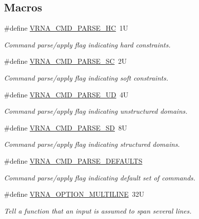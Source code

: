 \subsection*{Macros}
\begin{DoxyCompactItemize}
\item 
\#define \hyperlink{group__file__utils_gac54dec838d7b6bebd5df85f71702d324}{V\+R\+N\+A\+\_\+\+C\+M\+D\+\_\+\+P\+A\+R\+S\+E\+\_\+\+HC}~1U
\begin{DoxyCompactList}\small\item\em Command parse/apply flag indicating hard constraints. \end{DoxyCompactList}\item 
\#define \hyperlink{group__file__utils_ga8cad3c1f83e6f149829c49a186a83e21}{V\+R\+N\+A\+\_\+\+C\+M\+D\+\_\+\+P\+A\+R\+S\+E\+\_\+\+SC}~2U
\begin{DoxyCompactList}\small\item\em Command parse/apply flag indicating soft constraints. \end{DoxyCompactList}\item 
\#define \hyperlink{group__file__utils_ga6c6409780698826b04ebfed9151d7649}{V\+R\+N\+A\+\_\+\+C\+M\+D\+\_\+\+P\+A\+R\+S\+E\+\_\+\+UD}~4U
\begin{DoxyCompactList}\small\item\em Command parse/apply flag indicating unstructured domains. \end{DoxyCompactList}\item 
\#define \hyperlink{group__file__utils_gaf5e20210173cdb83bf70256a454f284b}{V\+R\+N\+A\+\_\+\+C\+M\+D\+\_\+\+P\+A\+R\+S\+E\+\_\+\+SD}~8U
\begin{DoxyCompactList}\small\item\em Command parse/apply flag indicating structured domains. \end{DoxyCompactList}\item 
\#define \hyperlink{group__file__utils_ga0a6c88e21e366dca14958d69cd024008}{V\+R\+N\+A\+\_\+\+C\+M\+D\+\_\+\+P\+A\+R\+S\+E\+\_\+\+D\+E\+F\+A\+U\+L\+TS}
\begin{DoxyCompactList}\small\item\em Command parse/apply flag indicating default set of commands. \end{DoxyCompactList}\item 
\#define \hyperlink{group__file__utils_gabec89c09874528c6cb73140a4c3d86d7}{V\+R\+N\+A\+\_\+\+O\+P\+T\+I\+O\+N\+\_\+\+M\+U\+L\+T\+I\+L\+I\+NE}~32U
\begin{DoxyCompactList}\small\item\em Tell a function that an input is assumed to span several lines. \end{DoxyCompactList}\item 

\end{DoxyCompactItemize}
